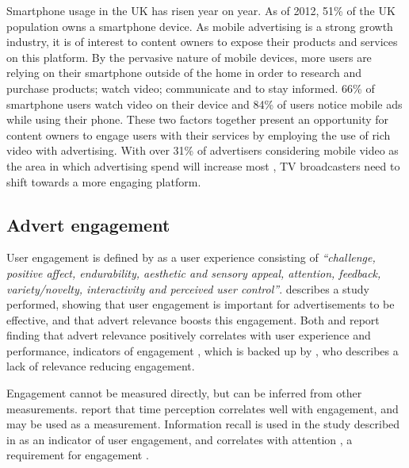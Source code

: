 		Smartphone usage in the UK has risen year on year. As of 2012, 51\% of the UK population owns a smartphone device. As mobile advertising is a strong growth industry, it is of interest to content owners to expose their products and services on this platform. By the pervasive nature of mobile devices, more users are relying on their smartphone outside of the home in order to research and purchase products; watch video; communicate and to stay informed. 66\% of smartphone users watch video on their device and 84\% of users notice mobile ads while using their phone. \citep{mobile-planet} These two factors together present an opportunity for content owners to engage users with their services by employing the use of rich video with advertising. With over 31\% of advertisers considering mobile video as the area in which advertising spend will increase most \citep{brightroll-report}, TV broadcasters need to shift towards a more engaging platform.

\subsection{Advert engagement}

	User engagement is defined by \citet{what_is_engagement} as a user experience consisting of \textit{``challenge, positive affect, endurability, aesthetic and sensory appeal, attention, feedback, variety/novelty, interactivity and perceived user control''}. \citet{advert_engagement} describes a study performed, showing that user engagement is important for advertisements to be effective, and that advert relevance boosts this engagement. Both \citet{advert_engagement} and \citet{yahoo-intrusive-advertising} report finding that advert relevance positively correlates with user experience and performance, indicators of engagement \citep{what_is_engagement}, which is backed up by \citet{plummer2006measures}, who describes a lack of relevance reducing engagement.

	Engagement cannot be measured directly, but can be inferred from other measurements. \citet{time_perception} report that time perception correlates well with engagement, and may be used as a measurement. Information recall is used in the study described in \citep{advert_engagent} as an indicator of user engagement, and correlates with attention \citep{interactions_attention_memory}, a requirement for engagement \cite{what_is_engagement}.

	\citet{informationOverload}

	\citet{humanVariables}

